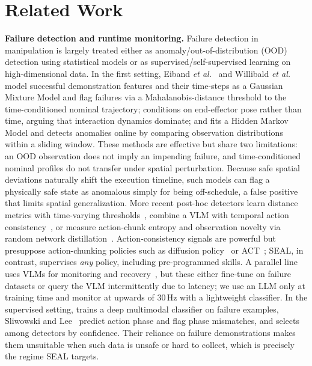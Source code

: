 \section{Related Work}
\label{sec:related}
\textbf{Failure detection and runtime monitoring.} Failure detection in manipulation is largely treated either as anomaly/out-of-distribution (OOD) detection using statistical models or as supervised/self-supervised learning on high-dimensional data. In the first setting, Eiband \emph{et al.}~\cite{eiband_intuitive_2019} and Willibald \emph{et al.}~\cite{willibald_collaborative_2020} model successful demonstration features and their time-steps as a Gaussian Mixture Model and flag failures via a Mahalanobis-distance threshold to the time-conditioned nominal trajectory; \cite{hierarchical} conditions on end-effector pose rather than time, arguing that interaction dynamics dominate; and \cite{10.5555/3398761.3398779} fits a Hidden Markov Model and detects anomalies online by comparing observation distributions within a sliding window. These methods are effective but share two limitations: an OOD observation does not imply an impending failure, and time-conditioned nominal profiles do not transfer under spatial perturbation. Because safe spatial deviations naturally shift the execution timeline, such models can flag a physically safe state as anomalous simply for being off-schedule, a false positive that limits spatial generalization. More recent post-hoc detectors learn distance metrics with time-varying thresholds~\cite{xu_can_2025}, combine a VLM with temporal action consistency~\cite{agia2024unpacking}, or measure action-chunk entropy and observation novelty via random network distillation~\cite{romer2025fiper}. Action-consistency signals are powerful but presuppose action-chunking policies such as diffusion policy~\cite{chi2024diffusionpolicy} or ACT~\cite{Zhao-RSS-23}; SEAL, in contrast, supervises \emph{any} policy, including pre-programmed skills. A parallel line uses VLMs for monitoring and recovery~\cite{sinha_real-time_2024,etukuru_robot_2024,elhafsi_semantic_2023,du_vision-language_2023,zhang_grounding_2023,pacaud_guardian_2025,agia2024unpacking}, but these either fine-tune on failure datasets or query the VLM intermittently due to latency; we use an LLM only at training time and monitor at upwards of 30\,Hz with a lightweight classifier. In the supervised setting, \cite{9636455} trains a deep multimodal classifier on failure examples, Sliwowski and Lee~\cite{sliwowski_conditionnet_2025} predict action phase and flag phase mismatches, and \cite{11245878} selects among detectors by confidence. Their reliance on failure demonstrations makes them unsuitable when such data is unsafe or hard to collect, which is precisely the regime SEAL targets.

